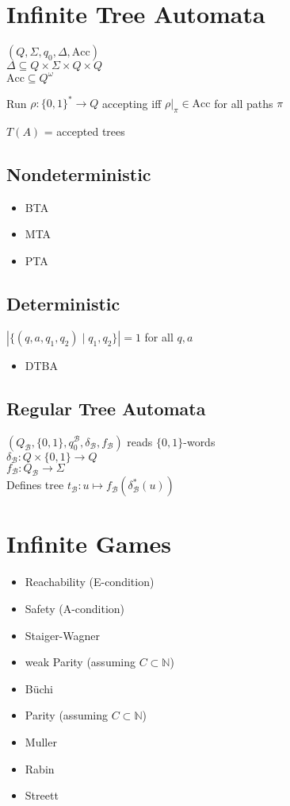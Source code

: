 \documentclass{article}
\begin{document}
\newpage
\section{Infinite Tree Automata}
$(Q, \Sigma, q_0, \Delta, \text{Acc})$ \\
$\Delta \subseteq Q \times \Sigma \times Q \times Q$ \\
$\text{Acc} \subseteq Q^\omega$

Run $\rho : \{0,1\}^* \rightarrow Q$ accepting iff $\rho \vert_\pi \in \text{Acc}$ for all paths $\pi$

$T(A)$ = accepted trees

\subsection{Nondeterministic}
\begin{itemize}
	\item BTA
	\item MTA
	\item PTA
\end{itemize}

\subsection{Deterministic}
$| \{ (q, a, q_1, q_2) \mid q_1, q_2 \} | = 1$ for all $q, a$

\begin{itemize}
	\item DTBA
\end{itemize}

\subsection{Regular Tree Automata}
$(Q_\mathcal{B}, \{0, 1\}, q_0^\mathcal{B}, \delta_\mathcal{B}, f_\mathcal{B})$ reads $\{0,1\}$-words \\
$\delta_\mathcal{B} : Q \times \{0, 1\} \rightarrow Q$ \\
$f_\mathcal{B} : Q_\mathcal{B} \rightarrow \Sigma$ \\

Defines tree $t_\mathcal{B} : u \mapsto f_\mathcal{B}(\delta^*_\mathcal{B}(u))$



\newpage
\section{Infinite Games}
\begin{itemize}
	\item Reachability (E-condition)
	\item Safety (A-condition)
	\item Staiger-Wagner
	\item weak Parity (assuming $C \subset \mathbb{N}$)
	\item Büchi
	\item Parity (assuming $C \subset \mathbb{N}$)
	\item Muller
	\item Rabin
	\item Streett 
\end{itemize}
\end{document}
